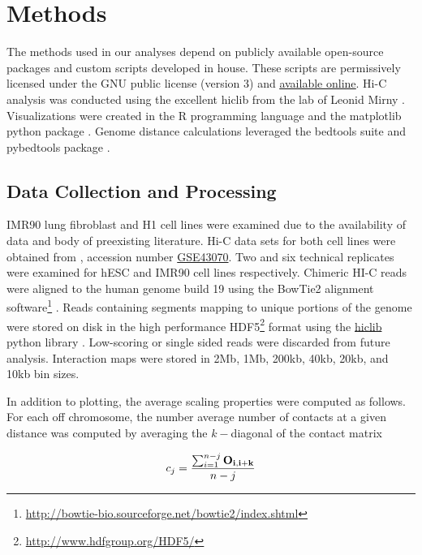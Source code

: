 \chapter{Methods}

The methods used in our analyses depend on publicly available open-source packages and custom scripts developed in house.
These scripts are permissively licensed under the GNU public license (version 3) and
\href{https://github.com/New-College-of-Florida/Jonathan-Niles-Thesis}{\underline{available online}}.  Hi-C analysis was conducted using
the excellent hiclib from the lab of Leonid Mirny \citep{imakaev2012}.  Visualizations were created in the R programming
language \citep{r2014} and the matplotlib python package \citep{hunter2007}.  Genome distance calculations leveraged the
bedtools suite \citep{quinlan2010} and pybedtools package \citep{dale2011}.

\section*{Data Collection and Processing}

IMR90 lung fibroblast and H1  cell lines were examined due to the availability of data and body of preexisting
literature.  Hi-C data sets for both cell lines were obtained from  \citep{edgar2002}, accession number
\href{http://www.ncbi.nlm.nih.gov/geo/query/acc.cgi?acc=GSE43070}{GSE43070}.  Two and six technical replicates were examined for
\gls{hESC} and IMR90 cell lines respectively.  Chimeric HI-C reads were aligned to the human genome build 19 using the BowTie2
alignment software\footnote{\url{http://bowtie-bio.sourceforge.net/bowtie2/index.shtml}} \citep{langmead2012}. Reads containing
segments mapping to unique portions of the genome were stored on disk in the high performance
HDF5\footnote{\url{http://www.hdfgroup.org/HDF5/}} format using the \href{https://bitbucket.org/mirnylab/hiclib}{hiclib} python
library \citep{imakaev2012}.  Low-scoring or single sided reads were discarded from future analysis.  Interaction maps were
stored in 2Mb, 1Mb, 200kb, 40kb, 20kb, and 10kb bin sizes.

In addition to plotting, the average scaling properties were computed as follows.  For each off chromosome, the number average
number of contacts at a given distance was computed by averaging the $k-$diagonal of the contact matrix

\begin{align}
  c_j = \frac{\sum_{i=1}^{n - j} \mathbf{O_{i, i+k}}}{n - j} \label{eq:probeScale}
\end{align}

